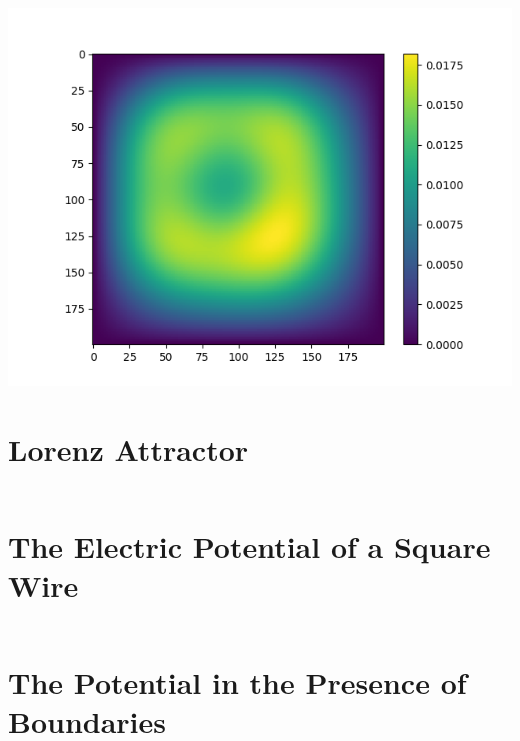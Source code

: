 \documentclass[10pt]{amsart}
\begin{document}
\centering
\includegraphics[width=0.8\linewidth]{../P3_3.png}


\appendix
\newpage
\section{Lorenz Attractor}%
\label{sec:lorenz_attractor}

\inputminted[linenos,breaklines]{python}{../P1.py}

\newpage
\section{The Electric Potential of a Square Wire}%
\label{sec:the_electric_potential_of_a_square_wire}

\inputminted[linenos,breaklines]{python}{../P2.py}

\newpage
\section{The Potential in the Presence of Boundaries}%
\label{sec:the_potential_in_the_presence_of_boundaries}

\inputminted[linenos,breaklines]{python}{../P3.py}
\end{document}
